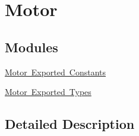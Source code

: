 \hypertarget{group___motor}{}\section{Motor}
\label{group___motor}
\subsection*{Modules}
\begin{DoxyCompactItemize}
\item 
\mbox{\hyperlink{group___motor___exported___constants}{Motor Exported Constants}}
\item 
\mbox{\hyperlink{group___motor___exported___types}{Motor Exported Types}}
\end{DoxyCompactItemize}


\subsection{Detailed Description}
